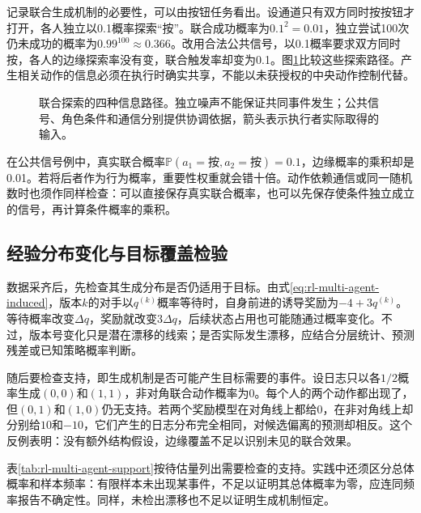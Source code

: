 记录联合生成机制的必要性，可以由按钮任务看出。设通道只有双方同时按按钮才打开，各人独立以0.1概率探索“按”。联合成功概率为$0.1^2=0.01$，独立尝试100次仍未成功的概率为$0.99^{100}\approx0.366$。改用合法公共信号，以0.1概率要求双方同时按，各人的边缘探索率没有变，联合触发率却变为0.1。图\ref{fig:rl-multi-agent-exploration}比较这些探索路径。产生相关动作的信息必须在执行时确实共享，不能以未获授权的中央动作控制代替。

\begin{figure}[htbp]
 \centering
 
 \caption{联合探索的四种信息路径。独立噪声不能保证共同事件发生；公共信号、角色条件和通信分别提供协调依据，箭头表示执行者实际取得的输入。}
 \label{fig:rl-multi-agent-exploration}
\end{figure}

在公共信号例中，真实联合概率$\mathbb P(a_1=\text{按},a_2=\text{按})=0.1$，边缘概率的乘积却是0.01。若将后者作为行为概率，重要性权重就会错十倍。动作依赖通信或同一随机数时也须作同样检查：可以直接保存真实联合概率，也可以先保存使条件独立成立的信号，再计算条件概率的乘积。

\subsection{经验分布变化与目标覆盖检验}
\label{sec:rl-multi-agent-coverage}

数据采齐后，先检查其生成分布是否仍适用于目标。由式\eqref{eq:rl-multi-agent-induced}，版本$k$的对手以$q^{(k)}$概率等待时，自身前进的诱导奖励为$-4+3q^{(k)}$。等待概率改变$\Delta q$，奖励就改变$3\Delta q$，后续状态占用也可能随通过概率变化。不过，版本号变化只是潜在漂移的线索；是否实际发生漂移，应结合分层统计、预测残差或已知策略概率判断。

随后要检查支持，即生成机制是否可能产生目标需要的事件。设日志只以各$1/2$概率生成$(0,0)$和$(1,1)$，非对角联合动作概率为0。每个人的两个动作都出现了，但$(0,1)$和$(1,0)$仍无支持。若两个奖励模型在对角线上都给0，在非对角线上却分别给$10$和$-10$，它们产生的日志分布完全相同，对候选偏离的预测却相反。这个反例表明：没有额外结构假设，边缘覆盖不足以识别未见的联合效果。

表\ref{tab:rl-multi-agent-support}按待估量列出需要检查的支持。实践中还须区分总体概率和样本频率：有限样本未出现某事件，不足以证明其总体概率为零，应连同频率报告不确定性。同样，未检出漂移也不足以证明生成机制恒定。

